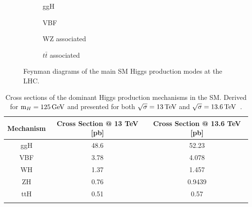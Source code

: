 \begin{figure}[h]
    \centering
    \begin{subfigure}{0.45\textwidth}
        \centering
        
        \caption{ggH}
    \end{subfigure}
    \hfill
    \begin{subfigure}{0.45\textwidth}
        \centering
        
        \caption{VBF}
    \end{subfigure}

    \vspace{0.5cm}

    \begin{subfigure}{0.45\textwidth}
        \centering
        \raisebox{-5mm}{}
        \caption{WZ associated}
    \end{subfigure}
    \hfill
    \begin{subfigure}{0.45\textwidth}
        \centering
        
        \caption{$t\bar{t}$ associated}
    \end{subfigure}

    \caption{Feynman diagrams of the main SM Higgs production modes at the LHC.}
    \label{Figure:Introduction_HiggsProductionModes}
\end{figure}


\begin{table}[htbp]
\centering
\renewcommand{\arraystretch}{1.5} %
\begin{tabular}{|c|c|c|}
\hline
Mechanism & Cross Section @ 13 TeV [pb] & Cross Section @ 13.6 TeV [pb] \\ \hline \hline 
ggH                                & 48.6  & 52.23 \\ 
\arrayrulecolor{lightgray} \hline
VBF                                & 3.78  & 4.078 \\ 
\arrayrulecolor{lightgray} \hline
WH                                 & 1.37  & 1.457 \\ 
\arrayrulecolor{lightgray} \hline
ZH                                 & 0.76  & 0.9439 \\ 
\arrayrulecolor{lightgray} \hline
ttH                                & 0.51  & 0.57 \\ 
\arrayrulecolor{black} \hline
\end{tabular}
\caption[Cross sections of dominant SM Higgs production modes at $13$ and $13.6\TeV$]{Cross sections of the dominant Higgs production mechanisms in the SM. Derived for $\text{m}_H = 125\,\text{Ge\hspace{-.08em}V}$ and presented for both $\sqrt{\sigma}=13\,\text{Te\hspace{-.08em}V}$ and $\sqrt{\sigma}=13.6\,\text{Te\hspace{-.08em}V}$~\cite{HiggsProduction_XS_13TeV,HiggsProduction_XS_13p6TeV}.}
\label{Table:Introduction_HiggsProduction_XS}
\end{table}


